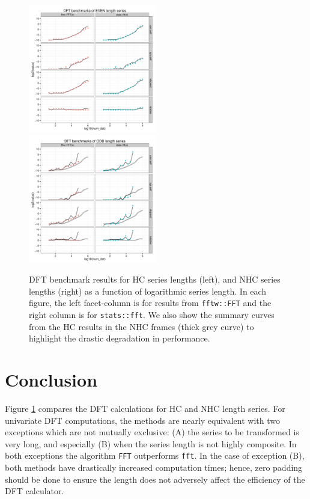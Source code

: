 \documentclass[12pt]{article}\usepackage{graphicx, color}
\newcommand{\Rcmd}[1]{\texttt{#1}}
\begin{document}
\begin{figure}[htb!]
\begin{center}
\includegraphics[width=0.5\textwidth]{fftw_bench_even}%
\includegraphics[width=0.5\textwidth]{fftw_bench_odd}
\caption{ DFT benchmark results for HC series lengths (left),
and NHC series lengths (right) as a function of logarithmic
series length.  In each figure, the left
facet-column is for results from \Rcmd{fftw::FFT} and the right
column is for \Rcmd{stats::fft}.
We also show the summary curves from the HC results
in the NHC frames (thick grey curve)
to highlight the drastic degradation in performance.}
\label{fig:results}
\end{center}
\end{figure}

\section{Conclusion}

Figure \ref{fig:results} compares the DFT
calculations for HC and NHC length series.
For univariate DFT computations,
the methods are nearly equivalent with two exceptions which
are not mutually exclusive: 
(A) the series to be transformed is very long, and 
especially (B) when the series length is not highly composite.
In both exceptions the algorithm \Rcmd{FFT} outperforms \Rcmd{fft}.
In the case of exception (B), both methods have
drastically increased computation times; hence, zero padding should be
done to ensure the length does not adversely
affect the efficiency of the DFT calculator.
\end{document}

